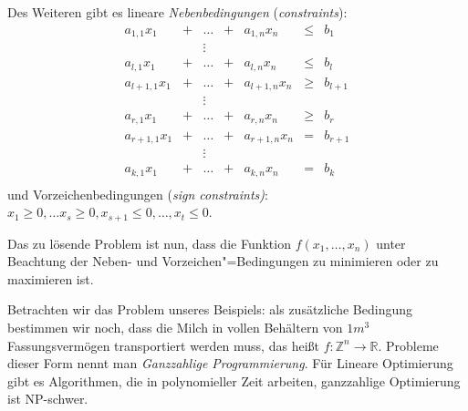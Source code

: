 Des Weiteren gibt es lineare \textit{Nebenbedingungen} (\textit{constraints}):
\[
  \begin{matrix}
    a_{1,1} x_1 &+& \ldots &+& a_{1,n} x_n &\le& b_1 \\
                & & \vdots\\
    a_{l,1} x_1 &+& \ldots &+& a_{l,n} x_n &\le& b_l\\
    a_{l+1,1} x_1 &+& \ldots &+& a_{l+1,n} x_n &\ge& b_{l+1}\\
                & & \vdots\\
    a_{r,1} x_1 &+& \ldots &+& a_{r,n} x_n &\ge& b_r\\
    a_{r+1,1} x_1 &+& \ldots &+& a_{r+1,n} x_n &=& b_{r+1}\\
                & & \vdots\\
    a_{k,1} x_1 &+& \ldots &+& a_{k,n} x_n &=& b_k\\
  \end{matrix}
\]
und Vorzeichenbedingungen (\textit{sign constraints)}: $x_1 \ge 0, \ldots x_s \ge 0, x_{s+1} \le 0, \ldots, x_t \le 0$.

Das zu lösende Problem ist nun, dass die Funktion $f(x_1, \ldots, x_n)$ unter Beachtung der Neben- und Vorzeichen"=Bedingungen zu minimieren oder zu maximieren ist.

Betrachten wir das Problem unseres Beispiels: als zusätzliche Bedingung bestimmen wir noch, dass die Milch in vollen Behältern von $1 m^3$ Fassungsvermögen transportiert werden muss, das heißt $f : \mathbb{Z}^n \to \mathbb{R}$. Probleme dieser Form nennt man \textit{Ganzzahlige Programmierung}. Für Lineare Optimierung gibt es Algorithmen, die in polynomieller Zeit arbeiten, ganzzahlige Optimierung ist NP-schwer.

